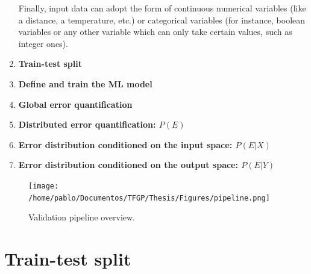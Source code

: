 \begin{enumerate}
	Finally, input data can adopt the form of continuous numerical variables (like a distance, a temperature, etc.) or categorical variables (for instance, boolean variables or any other variable which can only take certain values, such as integer ones). 
	
	\item\label{item:tt_split}\textbf{Train-test split}
	\item\label{item:defineettrain}\textbf{Define and train the ML model}
	\item\label{item:errquant}\textbf{Global error quantification}
	\item\label{item:errdist}\textbf{Distributed error quantification: $P(E)$}
	\item\label{item:errinput}\textbf{Error distribution conditioned on the input space: $P(E|X)$}
	\item\label{item:errout}\textbf{Error distribution conditioned on the output space: $P(E|Y)$}
\end{enumerate}

\begin{figure}[!htb]
	\centering
	\texttt{[image: /home/pablo/Documentos/TFGP/Thesis/Figures/pipeline.png]}
	\caption{Validation pipeline overview.}
	\label{fig:pipeline}
\end{figure}
%
\clearpage
\section{Train-test split}\label{sec:ttsplit}
